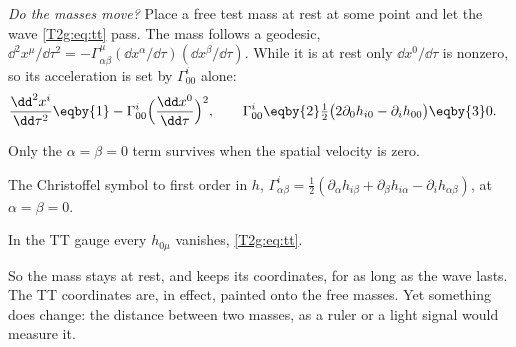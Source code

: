 \emph{Do the masses move?} Place a free test mass at rest at some point and let the wave \eqref{T2g:eq:tt} pass. The mass follows a geodesic, $\dd^2x^\mu/\dd\tau^2=-\Gamma^\mu_{\alpha\beta}(\dd x^\alpha/\dd\tau)(\dd x^\beta/\dd\tau)$. While it is at rest only $\dd x^0/\dd\tau$ is nonzero, so its acceleration is set by $\Gamma^i_{00}$ alone:
\begin{align}
  \frac{\dd^2x^i}{\dd\tau^2}
  &\eqby{1}-\Gamma^i_{00}\Big(\frac{\dd x^0}{\dd\tau}\Big)^2,\qquad
  \Gamma^i_{00}\eqby{2}\tfrac12\big(2\partial_0h_{i0}-\partial_ih_{00}\big)\eqby{3}0 .
\end{align}
\begin{explain}
  \item Only the $\alpha=\beta=0$ term survives when the spatial velocity is zero.
  \item The Christoffel symbol to first order in $h$, $\Gamma^i_{\alpha\beta}=\tfrac12(\partial_\alpha h_{i\beta}+\partial_\beta h_{i\alpha}-\partial_ih_{\alpha\beta})$, at $\alpha=\beta=0$.
  \item In the TT gauge every $h_{0\mu}$ vanishes, \eqref{T2g:eq:tt}.
\end{explain}
So the mass stays at rest, and keeps its coordinates, for as long as the wave lasts. The TT coordinates are, in effect, painted onto the free masses. Yet something does change: the distance between two masses, as a ruler or a light signal would measure it.

